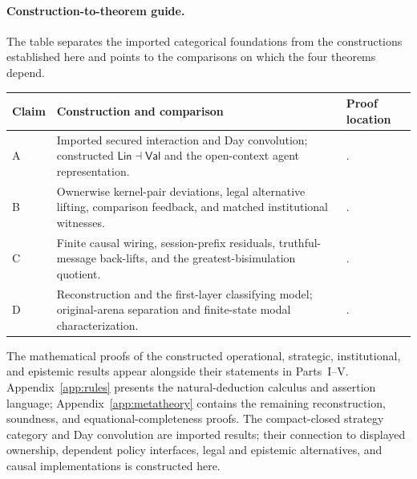\documentclass[11pt,a4paper]{article}
\numberwithin{equation}{section}
\theoremstyle{definition}
\theoremstyle{remark}
\theoremstyle{plain}
\providecommand{\Lin}{\mathsf{Lin}}
\providecommand{\Val}{\mathsf{Val}}
\begin{document}
\paragraph{Construction-to-theorem guide.}
The table separates the imported categorical foundations from the
constructions established here and points to the comparisons on which the
four theorems depend.
\begin{center}
\small
\begin{tabular}{@{}L{.12\textwidth}L{.38\textwidth}L{.41\textwidth}@{}}
\toprule
Claim & Construction and comparison & Proof location \\
\midrule
A & Imported secured interaction and Day convolution; constructed
$\Lin\dashv\Val$ and the open-context agent representation. &
. \\
B & Ownerwise kernel-pair deviations, legal alternative lifting,
comparison feedback, and matched institutional witnesses. &
. \\
C & Finite causal wiring, session-prefix residuals, truthful-message
back-lifts, and the greatest-bisimulation quotient. &
. \\
D & Reconstruction and the first-layer classifying model;
original-arena separation and finite-state modal characterization. &
. \\
\bottomrule
\end{tabular}
\end{center}
The mathematical proofs of the constructed operational, strategic,
institutional, and epistemic results appear alongside their statements
in Parts~I--V. Appendix~\ref{app:rules} presents the natural-deduction
calculus and assertion language; Appendix~\ref{app:metatheory} contains
the remaining reconstruction, soundness, and equational-completeness proofs.
The compact-closed strategy category and Day convolution are imported
results; their connection to displayed ownership, dependent policy
interfaces, legal and epistemic alternatives, and causal implementations
is constructed here.
\end{document}
